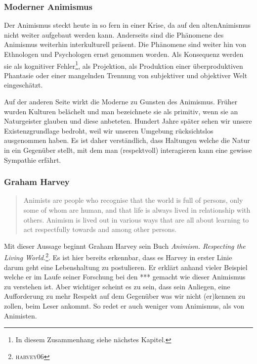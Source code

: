 \subsubsection*{Moderner Animismus}
Der Animismus steckt heute in so fern in einer Krise, da auf den \glqq alten\grqq Animismus nicht weiter aufgebaut werden kann. Anderseits sind die Phänomene des Animismus weiterhin interkulturell präsent. Die Phänomene sind weiter hin von Ethnologen und Psychologen ernst genommen worden. Als Konsequenz werden sie als kognitiver Fehler\footnote{In diesem Zusammenhang siehe nächstes Kapitel.}, als Projektion, als Produktion einer überproduktiven Phantasie oder einer mangelnden Trennung von subjektiver und objektiver Welt eingeschätzt. 

Auf der anderen Seite wirkt die Moderne zu Gunsten des Animismus. Früher wurden Kulturen belächelt und man bezeichnete sie als primitiv, wenn sie an Naturgeister glauben und diese anbeteten. Hundert Jahre später sehen wir unsere Existenzgrundlage bedroht, weil wir unseren Umgebung rücksichtslos ausgenommen haben. Es ist daher verständlich, dass Haltungen welche die Natur in ein Gegenüber stellt, mit dem man (respektvoll) interagieren kann eine gewisse Sympathie erfährt.

\subsubsection*{Graham Harvey}
\begin{quote}
	Animists are people who recognise that the world is full of persons, only some of whom are human, and that life is always lived in relationship with others. Animism is lived out in various ways that are all about learning to act respectfully towards and among other persons.\cite{harvey06}
\end{quote}

Mit dieser Aussage beginnt Graham Harvey sein Buch \emph{Animism. Respecting the Living World.}\footnote{\textsc{harvey06}}. Es ist hier bereits erkennbar, dass es Harvey in erster Linie darum geht eine Lebenshaltung zu postulieren. Er erklärt anhand vieler Beispiel welche er im Laufe seiner Forschung bei den *** gemacht wie dieser Animismus zu verstehen ist. Aber wichtiger scheint es zu sein, dass sein Anliegen, eine Aufforderung zu mehr Respekt auf dem Gegenüber was wir nicht (er)kennen zu zollen, beim Leser ankommt. So redet er auch weniger vom Animismus, als von Animisten.

